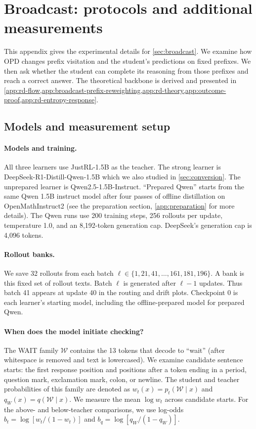\section{Broadcast: protocols and additional measurements}
\label{app:audit}\label{app:rd}
This appendix gives the experimental details for \cref{sec:broadcast}. We examine how OPD changes prefix visitation and the student's predictions on fixed prefixes. We then ask whether the student can complete its reasoning from those prefixes and reach a correct answer. The theoretical backbone is derived and presented in \cref{app:rd-flow,app:broadcast-prefix-reweighting,app:rd-theory,app:outcome-proof,app:rd-entropy-response}.

\subsection{Models and measurement setup}
\label{app:rd-protocol}

\paragraph{Models and training.}
All three learners use JustRL-1.5B as the teacher. The strong learner is DeepSeek-R1-Distill-Qwen-1.5B which we also studied in \cref{sec:conversion}. The unprepared learner is Qwen2.5-1.5B-Instruct. ``Prepared Qwen'' starts from the same Qwen 1.5B instruct model after four passes of offline distillation on OpenMathInstruct2 (see the preparation section, \cref{app:preparation} for more details). The Qwen runs use 200 training steps, 256 rollouts per update, temperature 1.0, and an 8,192-token generation cap. DeepSeek's generation cap is 4,096 tokens.

\paragraph{Rollout banks.}
We save 32 rollouts from each batch $\ell\in\{1,21,41,\ldots,161,181,196\}$. A bank is this fixed set of rollout texts. Batch $\ell$ is generated after $\ell-1$ updates. Thus batch 41 appears at update 40 in the routing and drift plots. Checkpoint 0 is each learner's starting model, including the offline-prepared model for prepared Qwen.


\paragraph{When does the model initiate checking?}
The WAIT family $\mathcal W$ contains the 13 tokens that decode to ``wait'' (after whitespace is removed and text is lowercased). We examine candidate sentence starts: the first response position and positions after a token ending in a period, question mark, exclamation mark, colon, or newline. The student and teacher probabilities of this family are denoted as $w_t(x)=p_t(\mathcal W\mid x)$ and $q_W(x)=q(\mathcal W\mid x)$. We measure the mean $\log w_t$ across candidate starts. For the above- and below-teacher comparisons, we use log-odds $b_t=\log[w_t/(1-w_t)]$ and $b_q=\log[q_W/(1-q_W)]$.

